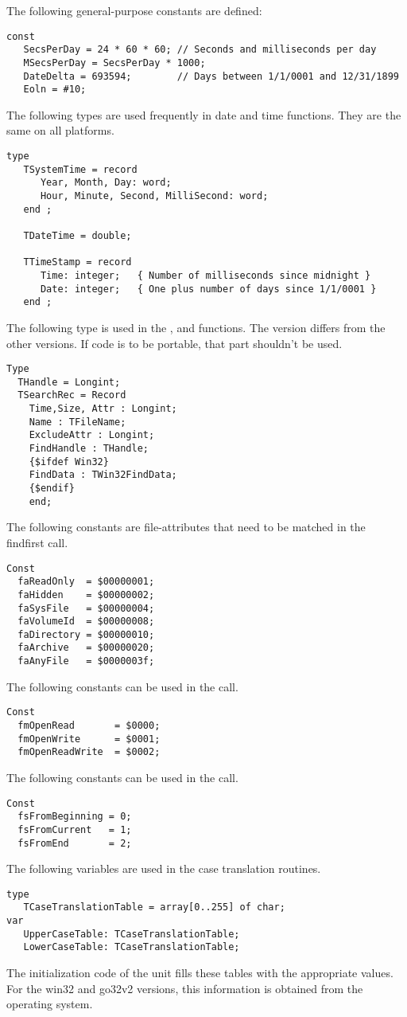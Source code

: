 The following general-purpose constants are defined:
\begin{verbatim}
const
   SecsPerDay = 24 * 60 * 60; // Seconds and milliseconds per day
   MSecsPerDay = SecsPerDay * 1000;
   DateDelta = 693594;        // Days between 1/1/0001 and 12/31/1899
   Eoln = #10;
\end{verbatim}
The following types are used frequently in date and time functions.
They are the same on all platforms.
\begin{verbatim}
type
   TSystemTime = record
      Year, Month, Day: word;
      Hour, Minute, Second, MilliSecond: word;
   end ;

   TDateTime = double;

   TTimeStamp = record
      Time: integer;   { Number of milliseconds since midnight }
      Date: integer;   { One plus number of days since 1/1/0001 }
   end ;
\end{verbatim}
The following type is used in the ,
and  functions. The  version differs from
the other versions. If code is to be portable, that part  shouldn't
be used.
\begin{verbatim}
Type
  THandle = Longint;
  TSearchRec = Record
    Time,Size, Attr : Longint;
    Name : TFileName;
    ExcludeAttr : Longint;
    FindHandle : THandle;
    {$ifdef Win32}
    FindData : TWin32FindData;
    {$endif}
    end;
\end{verbatim}
The following constants are file-attributes that need to be matched in the
findfirst call.
\begin{verbatim}
Const
  faReadOnly  = $00000001;
  faHidden    = $00000002;
  faSysFile   = $00000004;
  faVolumeId  = $00000008;
  faDirectory = $00000010;
  faArchive   = $00000020;
  faAnyFile   = $0000003f;
\end{verbatim}
The following constants can be used in the  call.
\begin{verbatim}
Const
  fmOpenRead       = $0000;
  fmOpenWrite      = $0001;
  fmOpenReadWrite  = $0002;
\end{verbatim}
The following constants can be used in the  call.
\begin{verbatim}
Const
  fsFromBeginning = 0;
  fsFromCurrent   = 1;
  fsFromEnd       = 2;

\end{verbatim}
The following variables are used in the case translation routines.
\begin{verbatim}
type
   TCaseTranslationTable = array[0..255] of char;
var
   UpperCaseTable: TCaseTranslationTable;
   LowerCaseTable: TCaseTranslationTable;
\end{verbatim}
The initialization code of the  unit fills these
tables with the appropriate values. For the win32 and go32v2
versions, this information is obtained from the operating system.

